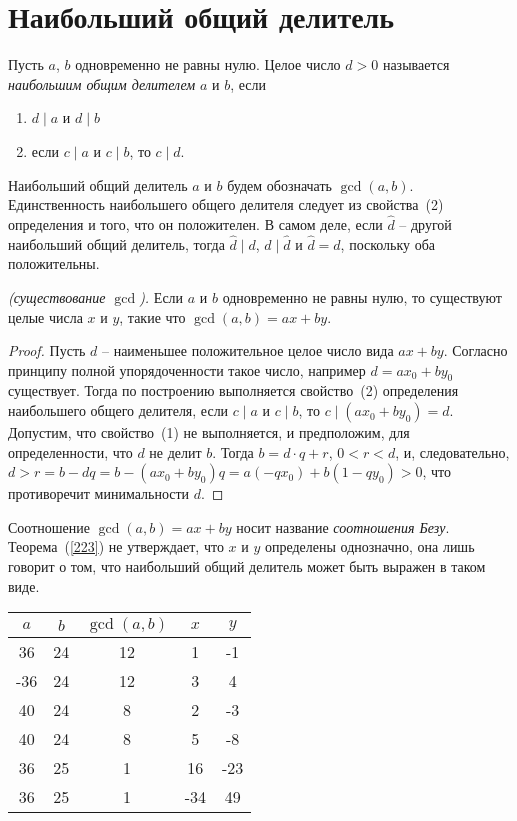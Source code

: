 \documentclass[14pt]{extreport}
\begin{document}
\section{Наибольший общий делитель}

\begin{definition}
Пусть $a$, $b$ одновременно не равны нулю. Целое число $d > 0$
называется \emph{наибольшим общим делителем} $a$ и $b$, если
\begin{enumerate}
  \item $d \mid a$ и $d \mid b$
  \item если $c \mid a$ и $c \mid b$, то $c \mid d$.
\end{enumerate}
\end{definition}
 Наибольший общий делитель $a$ и $b$ будем обозначать $\gcd(a, b)$.
Единственность наибольшего общего делителя следует из свойства~(2)
определения и того, что он положителен.  В самом деле, если
$\hat d$ -- другой наибольший общий делитель, тогда $\hat d \mid d$,
$d \mid \hat d$  и $\hat d = d$, поскольку оба положительны.

\begin{theorem}\emph{(существование $\gcd$).} \label{223}
Если $a$ и $b$ одновременно не равны нулю, то существуют
целые числа $x$ и $y$, такие что $\gcd(a, b) = ax+by$.
\end{theorem}
\begin{proof}
Пусть $d$ -- наименьшее положительное целое число вида $ax+by$.
Согласно принципу полной упорядоченности такое число, например
$d = ax_0+by_0$ существует. Тогда по построению выполняется
свойство~(2) определения наибольшего общего делителя,
если $c \mid a$ и $c \mid b$, то $c \mid (ax_0+by_0) = d$.
Допустим, что свойство~(1) не выполняется, и предположим, для
определенности, что $d$ не делит $b$. Тогда $b = d\cdot q + r$,
$0 < r < d$, и, следовательно, $d > r = b - dq = b - (ax_0+by_0)q=
a(-qx_0)+b(1-qy_0)> 0$, что противоречит минимальности $d$.
\end{proof}

Соотношение $\gcd(a, b) = ax+by$ носит название \emph{соотношения Безу}.
Теорема~(\ref{223}) не утверждает, что $x$ и  $y$ определены
однозначно, она лишь говорит о том, что
наибольший общий делитель может быть выражен в таком виде.

\begin{example}

\begin{tabular}[H]{|c|c|c|c|c|}
\hline
  $a$ & $b$ & $\gcd(a, b)$ & $x$ & $y$  \\ \hline
  36 & 24 & 12 & 1 & -1 \\ \hline
  -36 & 24 & 12 & 3 & 4 \\ \hline
  40 & 24 & 8 & 2 & -3 \\ \hline
  40 & 24 & 8 & 5 & -8 \\ \hline
  36 & 25 & 1 & 16 & -23 \\ \hline
  36 & 25 & 1 & -34 & 49 \\ \hline
\end{tabular}

\end{example}
\end{document}

